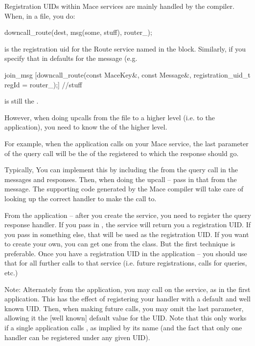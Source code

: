 Registration UIDs within Mace services are mainly handled by the
compiler.  When, in a \mac file, you do:

\begin{programlisting}
downcall_route(dest, msg(some, stuff), router_);
\end{programlisting}

 is the registration uid for the Route service 
named  in the  block.
Similarly, if you specify that in defaults for the message (e.g.
  
\begin{programlisting}
join_msg [downcall_route(const MaceKey&, const Message&, registration_uid_t regId = router_);] {
   //stuff
}
\end{programlisting}

 is still the .

However, when doing upcalls from the \mac file to a higher level (i.e. to the
application), you need to know the  of the
higher level.

For example, when the application calls  on your Mace
service, the last parameter of the query call will be the
 of the registered
 to which the response should go.

Typically, You can implement this by including the
 from the query call in the messages and
responses.  Then, when doing the upcall -- pass in that
 from the message.  The supporting code
generated by the Mace compiler will take care of looking up the correct handler
to make the call to.

From the application -- after you create the service, you need to
register the query response handler.  If you pass in , the
service will return you a registration UID.  If you pass in something
else, that will be used as the registration UID.  If you want to
create your own, you can get one from the  class.  But the
first technique is preferable.  Once you have a registration UID in
the application -- you should use that for all further calls to that
service (i.e. future registrations, calls for queries, etc.)

Note: Alternately from the application, you may call 
on the service, as in the first  application.  This has the effect of
registering your handler with a default and well known UID.  Then, when
making future calls, you may omit the last parameter, allowing it 
the [well known] default value for the UID.  Note that this only works
if a single application calls , as 
implied by its name (and the fact that only one handler can be registered
under any given UID).

